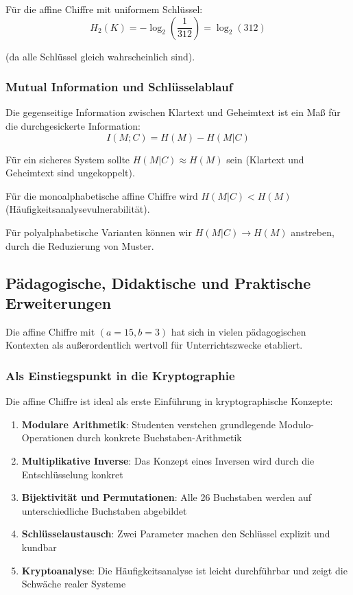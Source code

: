 ﻿\documentclass[12pt,a4paper]{article}
\begin{document}
	Für die affine Chiffre mit uniformem Schlüssel:
	\begin{equation}
		H_2(K) = -\log_2\left(\frac{1}{312}\right) = \log_2(312)
	\end{equation}
	
	(da alle Schlüssel gleich wahrscheinlich sind).
	
	\subsubsection{Mutual Information und Schlüsselablauf}
	
	Die gegenseitige Information zwischen Klartext und Geheimtext ist ein Maß für die durchgesickerte Information:
	\begin{equation}
		I(M; C) = H(M) - H(M|C)
	\end{equation}
	
	Für ein sicheres System sollte $H(M|C) \approx H(M)$ sein (Klartext und Geheimtext sind ungekoppelt).
	
	Für die monoalphabetische affine Chiffre wird $H(M|C) < H(M)$ (Häufigkeitsanalyse\-vulnerabilität).
	
	Für polyalphabetische Varianten können wir $H(M|C) \to H(M)$ anstreben, durch die Reduzierung von Muster.
	
	
	\subsection{Pädagogische, Didaktische und Praktische Erweiterungen}
	
	Die affine Chiffre mit $(a=15, b=3)$ hat sich in vielen pädagogischen Kontexten als außerordentlich wertvoll für Unterrichtszwecke etabliert.
	
	\subsubsection{Als Einstiegspunkt in die Kryptographie}
	
	Die affine Chiffre ist ideal als erste Einführung in kryptographische Konzepte:
	\begin{enumerate}
		\item \textbf{Modulare Arithmetik}: Studenten verstehen grundlegende Modulo-Operationen durch konkrete Buchstaben-Arithmetik
		\item \textbf{Multiplikative Inverse}: Das Konzept eines Inversen wird durch die Entschlüsselung konkret
		\item \textbf{Bijektivität und Permutationen}: Alle 26 Buchstaben werden auf unterschiedliche Buchstaben abgebildet
		\item \textbf{Schlüsselaustausch}: Zwei Parameter machen den Schlüssel explizit und kundbar
		\item \textbf{Kryptoanalyse}: Die Häufigkeitsanalyse ist leicht durchführbar und zeigt die Schwäche realer Systeme
	\end{enumerate}
	
\end{document}
